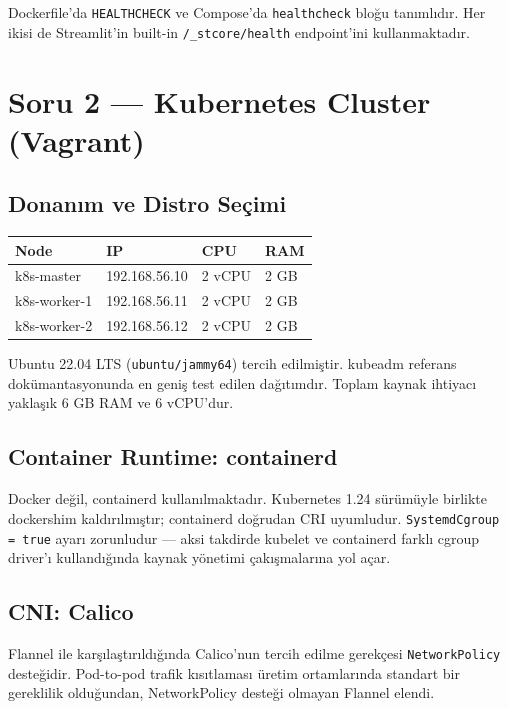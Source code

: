 \documentclass[12pt,a4paper]{article}
\begin{document}
Dockerfile'da \texttt{HEALTHCHECK} ve Compose'da \texttt{healthcheck}
bloğu tanımlıdır. Her ikisi de Streamlit'in built-in
\texttt{/\_stcore/health} endpoint'ini kullanmaktadır.

\section{Soru 2 — Kubernetes Cluster (Vagrant)}

\subsection{Donanım ve Distro Seçimi}

\begin{center}
\begin{tabular}{llll}
\toprule
\textbf{Node} & \textbf{IP} & \textbf{CPU} & \textbf{RAM} \\
\midrule
k8s-master   & 192.168.56.10 & 2 vCPU & 2 GB \\
k8s-worker-1 & 192.168.56.11 & 2 vCPU & 2 GB \\
k8s-worker-2 & 192.168.56.12 & 2 vCPU & 2 GB \\
\bottomrule
\end{tabular}
\end{center}

Ubuntu 22.04 LTS (\texttt{ubuntu/jammy64}) tercih edilmiştir.
kubeadm referans dokümantasyonunda en geniş test edilen dağıtımdır.
Toplam kaynak ihtiyacı yaklaşık 6 GB RAM ve 6 vCPU'dur.

\subsection{Container Runtime: containerd}

Docker değil, containerd kullanılmaktadır. Kubernetes 1.24 sürümüyle
birlikte dockershim kaldırılmıştır; containerd doğrudan CRI uyumludur.
\texttt{SystemdCgroup = true} ayarı zorunludur — aksi takdirde kubelet
ve containerd farklı cgroup driver'ı kullandığında kaynak yönetimi
çakışmalarına yol açar.

\subsection{CNI: Calico}

Flannel ile karşılaştırıldığında Calico'nun tercih edilme gerekçesi
\texttt{NetworkPolicy} desteğidir. Pod-to-pod trafik kısıtlaması
üretim ortamlarında standart bir gereklilik olduğundan,
NetworkPolicy desteği olmayan Flannel elendi.
\end{document}
